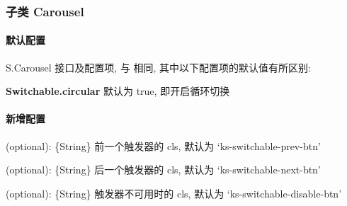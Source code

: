 \documentclass[letterpaper,10pt,english]{sphinxmanual}
\begin{document}
\subsubsection{子类 Carousel}
\label{api/component/switchable/carousel::doc}\label{api/component/switchable/carousel:carousel}

\paragraph{默认配置}
\label{api/component/switchable/carousel:id1}
S.Carousel 接口及配置项, 与 {\hyperref[api/component/switchable/switchable:Switchable.Switchable]{}} 相同, 其中以下配置项的默认值有所区别:

\textbf{Switchable.circular}    默认为 true, 即开启循环切换


\paragraph{新增配置}
\label{api/component/switchable/carousel:id2}

\begin{fulllineitems}
\label{api/component/switchable/carousel:Switchable.Carousel.prevBtnCls}
(optional):  \{String\} 前一个触发器的 cls, 默认为 `ks-switchable-prev-btn'

\end{fulllineitems}



\begin{fulllineitems}
\label{api/component/switchable/carousel:Switchable.Carousel.nextBtnCls}
(optional): \{String\} 后一个触发器的 cls, 默认为 `ks-switchable-next-btn'

\end{fulllineitems}



\begin{fulllineitems}
\label{api/component/switchable/carousel:Switchable.Carousel.disableBtnCls}
(optional): \{String\} 触发器不可用时的 cls, 默认为 `ks-switchable-disable-btn'

\end{fulllineitems}
\end{document}
